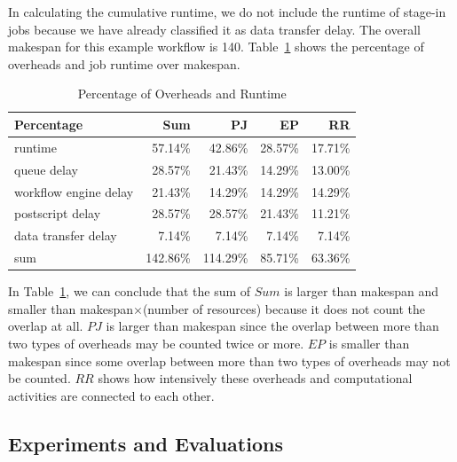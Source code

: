 
In calculating the cumulative runtime, we do not include the runtime of stage-in jobs because we have already classified it as data transfer delay. The overall makespan for this example workflow is 140. Table~\ref{tab:model_percentage_overhead} shows the percentage of overheads and job runtime over makespan.  

\begin{table}[h!]
\caption{Percentage of Overheads and Runtime}
\label{tab:model_percentage_overhead}
\centering
\begin{tabular}{lrrrr}
\hline
Percentage & Sum & PJ & EP &RR\\

\hline

runtime & 57.14\% & 42.86\% & 28.57\% &17.71\% \\
queue delay & 28.57\% &21.43\% &14.29\% &13.00\% \\
workflow engine delay & 21.43\% &14.29\%& 14.29\% &14.29\%\\
postscript delay & 28.57\% & 28.57\% & 21.43\% & 11.21\% \\
data transfer delay & 7.14\% & 7.14\% & 7.14\% & 7.14\% \\
sum & 142.86\% & 114.29\% & 85.71\% & 63.36\%\\
\hline
\end{tabular}
\end{table} 


In Table~\ref{tab:model_percentage_overhead}, we can conclude that the sum of $Sum$ is larger than makespan and smaller than makespan$\times$(number of resources) because it does not count the overlap at all. $PJ$ is larger than makespan since the overlap between more than two types of overheads may be counted twice or more. $EP$ is smaller than makespan since some overlap between more than two types of overheads may not be counted.  $RR$ shows how intensively these overheads and computational activities are connected to each other. 

\subsection{Experiments and Evaluations}


